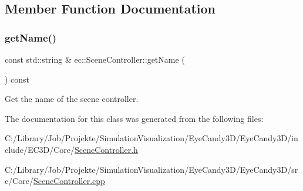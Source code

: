 \subsection{Member Function Documentation}
\mbox{\label{classec_1_1_scene_controller_af45d2fce41110dc9a128b900bde8ba14}} 
\subsubsection{\texorpdfstring{get\+Name()}{getName()}}
{\footnotesize\ttfamily const std\+::string \& ec\+::\+Scene\+Controller\+::get\+Name (\begin{DoxyParamCaption}{ }\end{DoxyParamCaption}) const}



Get the name of the scene controller. 



The documentation for this class was generated from the following files\+:\begin{DoxyCompactItemize}
\item 
C\+:/\+Library/\+Job/\+Projekte/\+Simulation\+Visualization/\+Eye\+Candy3\+D/\+Eye\+Candy3\+D/include/\+E\+C3\+D/\+Core/\mbox{\hyperlink{_scene_controller_8h}{Scene\+Controller.\+h}}\item 
C\+:/\+Library/\+Job/\+Projekte/\+Simulation\+Visualization/\+Eye\+Candy3\+D/\+Eye\+Candy3\+D/src/\+Core/\mbox{\hyperlink{_scene_controller_8cpp}{Scene\+Controller.\+cpp}}\end{DoxyCompactItemize}
